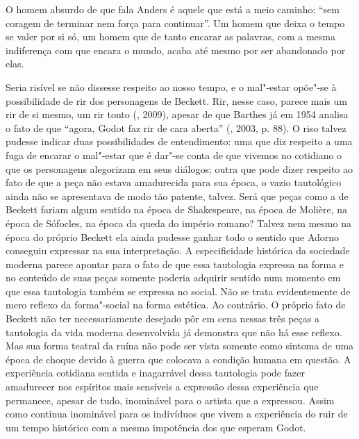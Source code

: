 O homem absurdo de que fala Anders é aquele que está a meio caminho:
``sem coragem de terminar nem força para continuar''. Um homem que deixa
o tempo se valer por si só, um homem que de tanto encarar as palavras, com a mesma
indiferença com que encara o mundo, acaba até mesmo por ser abandonado por elas.

Seria risível se não dissesse respeito ao nosso tempo, e o mal"-estar
opõe"-se à possibilidade de rir dos personagens de Beckett. Rir, nesse
caso, parece mais um rir de si mesmo, um rir tonto (, 2009),
apesar de que Barthes já em 1954 analisa o fato de que ``agora, Godot faz
rir de cara aberta'' (, 2003, p. 88). O riso talvez pudesse
indicar duas possibilidades de entendimento: uma que diz respeito a uma
fuga de encarar o mal"-estar que é dar"-se conta de que vivemos no
cotidiano o que os personagens alegorizam em seus diálogos; outra que
pode dizer respeito ao fato de que a peça não estava amadurecida para
sua época, o vazio tautológico ainda não se apresentava de modo tão
patente, talvez. Será que peças como a de Beckett fariam algum sentido
na época de Shakespeare, na época de Molière, na época de Sófocles, na
época da queda do império romano? Talvez nem mesmo na época do próprio
Beckett ela ainda pudesse ganhar todo o sentido que Adorno conseguiu
expressar na sua interpretação. A especificidade histórica da sociedade
moderna parece apontar para o fato de que essa tautologia expressa na
forma e no conteúdo de suas peças somente poderia adquirir sentido num momento
em que essa tautologia também se expressa no social. Não se
trata evidentemente de mero reflexo da forma"-social na forma estética.
Ao contrário. O próprio fato de Beckett não ter necessariamente desejado
pôr em cena nessas três peças a tautologia da vida moderna desenvolvida já
demonstra que não há esse reflexo. Mas sua forma teatral da ruína não
pode ser vista somente como sintoma de uma época de choque devido à
guerra que colocava a condição humana em questão. A experiência
cotidiana sentida e inagarrável dessa tautologia pode fazer amadurecer
nos espíritos mais sensíveis a expressão dessa experiência que
permanece, apesar de tudo, inominável para o artista que a expressou.
Assim como continua inominável para os indivíduos que vivem a
experiência do ruir de um tempo histórico com a mesma impotência dos que
esperam Godot.

